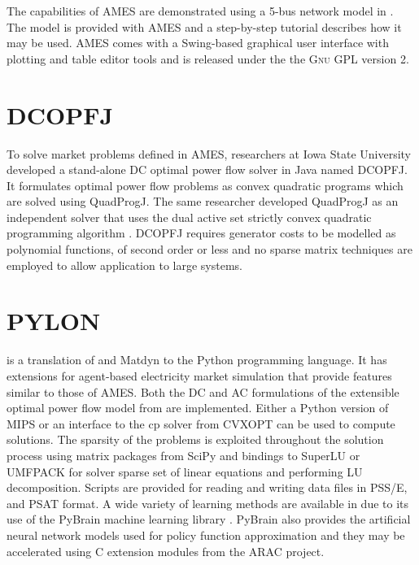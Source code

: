 The capabilities of AMES are demonstrated using a 5-bus network model in
.  The model is provided with AMES and a step-by-step
tutorial describes how it may be used.  AMES comes with a
Swing-based graphical user interface with plotting and table editor tools and
is released under the the \textsc{Gnu} GPL version 2.

\section{DCOPFJ}
\label{sec:dcopfj}
To solve market problems defined in AMES, researchers at Iowa State University
developed a stand-alone DC optimal power flow solver in Java named DCOPFJ.
It formulates optimal power flow problems as convex quadratic programs
which are solved using QuadProgJ.  The same researcher developed QuadProgJ as
an independent solver that uses the dual active set strictly convex quadratic
programming algorithm \cite{goldfarb:scqp}.  DCOPFJ requires
generator costs to be modelled as polynomial functions, of second order or
less and no sparse matrix techniques are employed to allow application to large
systems.

\section{PYLON}
\label{sec:pylon}

\pylon is a translation of \matpower and Matdyn to the Python programming
language.  It has extensions for agent-based electricity market simulation
that provide features similar to those of AMES.  Both the DC and AC
formulations of the extensible optimal power flow model \cite{zimmerman:mp_pes}
from \matpower are implemented.  Either a Python version of MIPS or an
interface to the cp solver from CVXOPT can be used to compute solutions.  The
sparsity of the problems is exploited throughout the solution process using
matrix packages from SciPy and bindings to SuperLU or UMFPACK for solver sparse
set of linear equations and performing LU decomposition.  Scripts are provided
for reading and writing data files in PSS/E, \matpower and PSAT format. A wide
variety of learning methods are available in \pylon due to its use of the
PyBrain machine learning library \cite{schaul:2010}.  PyBrain also provides
the artificial neural network models used for policy function approximation
and they may be accelerated using C extension modules from the ARAC project.

